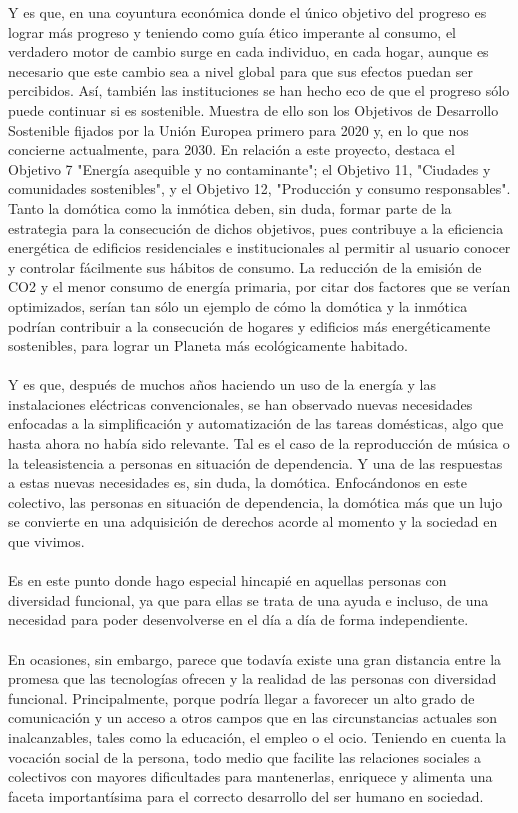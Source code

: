 Y es que, en una coyuntura económica donde el único objetivo del progreso es lograr más progreso y teniendo como guía ético imperante al consumo, el verdadero motor de cambio surge en cada individuo, en cada hogar, aunque es necesario que este cambio sea a nivel global para que sus efectos puedan ser percibidos. Así, también las instituciones se han hecho eco de que el progreso sólo puede continuar si es sostenible. Muestra de ello son los Objetivos de Desarrollo Sostenible \cite{ONU:2015} fijados por la Unión Europea primero para 2020 y, en lo que nos concierne actualmente, para 2030. En relación a este proyecto, destaca el Objetivo 7 "Energía asequible y no contaminante"; el Objetivo 11, "Ciudades y comunidades sostenibles", y el Objetivo 12, "Producción y consumo responsables". Tanto la domótica como la inmótica deben, sin duda, formar parte de la estrategia para la consecución de dichos objetivos, pues contribuye a la eficiencia energética de edificios residenciales e institucionales al permitir al usuario conocer y controlar fácilmente sus hábitos de consumo. La reducción de la emisión de CO2 y el menor consumo de energía primaria, por citar dos factores que se verían optimizados, serían tan sólo un ejemplo de cómo la domótica y la inmótica podrían contribuir a la consecución de hogares y edificios más energéticamente sostenibles, para lograr un Planeta más ecológicamente habitado.\\\\
Y es que, después de muchos años haciendo un uso de la energía y las instalaciones eléctricas convencionales, se han observado nuevas necesidades enfocadas a la simplificación y automatización de las tareas domésticas, algo que hasta ahora no había sido relevante. Tal es el caso de la reproducción de música o la teleasistencia a personas en situación de dependencia. Y una de las respuestas a estas nuevas necesidades es, sin duda, la domótica. Enfocándonos en este colectivo, las personas en situación de dependencia, la domótica más que un lujo se convierte en una adquisición de derechos acorde al momento y la sociedad en que vivimos. \\\\
Es en este punto donde hago especial hincapié en aquellas personas con diversidad funcional, ya que para ellas se trata de una ayuda e incluso, de una necesidad para poder desenvolverse en el día a día de forma independiente. \\\\
En ocasiones, sin embargo, parece que todavía existe una gran distancia entre la promesa que las tecnologías ofrecen y la realidad de las personas con diversidad funcional. Principalmente, porque podría llegar a favorecer un alto grado de comunicación y un acceso a otros campos que en las circunstancias actuales son inalcanzables, tales como la educación, el empleo o el ocio. Teniendo en cuenta la vocación social de la persona, todo medio que facilite las relaciones sociales a colectivos con mayores dificultades para mantenerlas, enriquece y alimenta una faceta importantísima para el correcto desarrollo del ser humano en sociedad. \\\\
